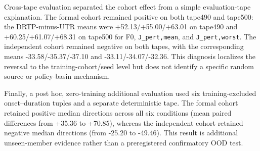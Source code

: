 Cross-tape evaluation separated the cohort effect from a simple evaluation-tape explanation. The formal cohort remained positive on both tape490 and tape500: the DRTP-minus-UTR means were +52.13/+55.00/+63.01 on tape490 and +60.25/+61.07/+68.31 on tape500 for F0, \texttt{J_pert,mean}, and \texttt{J_pert,worst}. The independent cohort remained negative on both tapes, with the corresponding means -33.58/-35.37/-37.10 and -33.11/-34.07/-32.36. This diagnosis localizes the reversal to the training-cohort/seed level but does not identify a specific random source or policy-basin mechanism.

Finally, a post hoc, zero-training additional evaluation used six training-excluded onset--duration tuples and a separate deterministic tape. The formal cohort retained positive median directions across all six conditions (mean paired differences from +35.36 to +70.85), whereas the independent cohort retained negative median directions (from -25.20 to -49.46). This result is additional unseen-member evidence rather than a preregistered confirmatory OOD test.